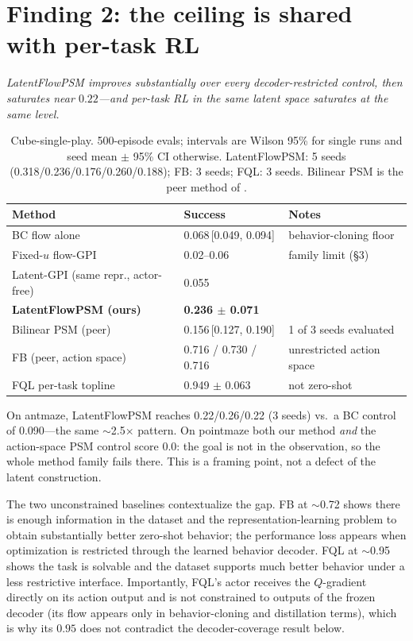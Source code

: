 \documentclass{article}
\begin{document}
\section{Finding 2: the ceiling is shared with per-task RL}
\emph{LatentFlowPSM improves substantially over every decoder-restricted control, then saturates near $0.22$---and per-task RL in the same latent space saturates at the same level.}

\begin{table}[h]
\centering
\small
\begin{tabular}{@{}lll@{}}
\toprule
Method & Success & Notes \\
\midrule
BC flow alone & 0.068\,[0.049, 0.094] & behavior-cloning floor \\
Fixed-$u$ flow-GPI & 0.02--0.06 & family limit (\S3) \\
Latent-GPI (same repr., actor-free) & 0.055 & \\
\textbf{LatentFlowPSM (ours)} & \textbf{0.236 $\pm$ 0.071} & \\
Bilinear PSM (peer) & 0.156\,[0.127, 0.190] & 1 of 3 seeds evaluated \\
FB (peer, action space) & 0.716 / 0.730 / 0.716 & unrestricted action space \\
FQL per-task topline & 0.949 $\pm$ 0.063 & not zero-shot \\
\bottomrule
\end{tabular}
\caption{Cube-single-play. 500-episode evals; intervals are Wilson 95\% for single runs and seed mean $\pm$ 95\% CI otherwise. LatentFlowPSM: 5 seeds (0.318/0.236/0.176/0.260/0.188); FB: 3 seeds; FQL: 3 seeds. Bilinear PSM is the peer method of \citet{agarwal2024protosm}.}
\label{tab:main}
\end{table}

On antmaze, LatentFlowPSM reaches 0.22/0.26/0.22 (3 seeds) vs.\ a BC control of 0.090---the same $\sim$2.5$\times$ pattern. On pointmaze both our method \emph{and} the action-space PSM control score 0.0: the goal is not in the observation, so the whole method family fails there. This is a framing point, not a defect of the latent construction.

The two unconstrained baselines contextualize the gap. FB at $\sim$0.72 shows there is enough information in the dataset and the representation-learning problem to obtain substantially better zero-shot behavior; the performance loss appears when optimization is restricted through the learned behavior decoder. FQL at $\sim$0.95 shows the task is solvable and the dataset supports much better behavior under a less restrictive interface. Importantly, FQL's actor receives the $Q$-gradient directly on its action output and is not constrained to outputs of the frozen decoder (its flow appears only in behavior-cloning and distillation terms), which is why its $0.95$ does not contradict the decoder-coverage result below.
\end{document}

